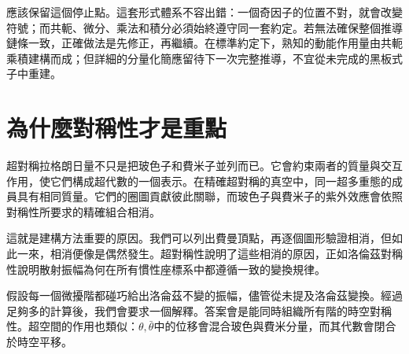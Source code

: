 應該保留這個停止點。這套形式體系不容出錯：一個奇因子的位置不對，就會改變符號；而共軛、微分、乘法和積分必須始終遵守同一套約定。若無法確保整個推導鏈條一致，正確做法是先修正，再繼續。在標準約定下，熟知的動能作用量由共軛乘積建構而成；但詳細的分量化簡應留待下一次完整推導，不宜從未完成的黑板式子中重建。

\section{為什麼對稱性才是重點}

超對稱拉格朗日量不只是把玻色子和費米子並列而已。它會約束兩者的質量與交互作用，使它們構成超代數的一個表示。在精確超對稱的真空中，同一超多重態的成員具有相同質量。它們的圈圖貢獻彼此關聯，而玻色子與費米子的紫外效應會依照對稱性所要求的精確組合相消。

這就是建構方法重要的原因。我們可以列出費曼頂點，再逐個圖形驗證相消，但如此一來，相消便像是偶然發生。超對稱性說明了這些相消的原因，正如洛倫茲對稱性說明散射振幅為何在所有慣性座標系中都遵循一致的變換規律。


\begin{classroomqa}
\end{classroomqa}

\begin{classroomqa}
\end{classroomqa}

假設每一個微擾階都碰巧給出洛侖茲不變的振幅，儘管從未提及洛侖茲變換。經過足夠多的計算後，我們會要求一個解釋。答案會是能同時組織所有階的時空對稱性。超空間的作用也類似：\(\theta,\bar\theta\)中的位移會混合玻色與費米分量，而其代數會閉合於時空平移。

\begin{classroomqa}
\end{classroomqa}


